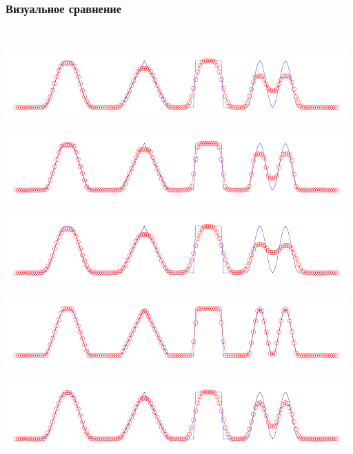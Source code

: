 \documentclass[ucs]{beamer}
\begin{document}
\begin{frame}
	\frametitle{Визуальное сравнение}
	\begin{columns}
		\\
		\includegraphics[width=\textwidth]{conver/mc}\\
		\\
		\includegraphics[width=\textwidth]{conver/superbee}\\
		\pause[2]
		\\
		\includegraphics[width=\textwidth]{conver/runge}\\
		\pause[3]
		\\
		\includegraphics[width=\textwidth]{conver/superbee_g}\\
		\\
		\includegraphics[width=\textwidth]{conver/third_g}\\
	\end{columns}
\end{frame}
\end{document}

